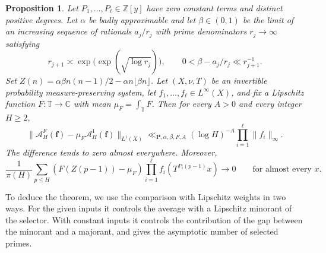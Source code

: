 \documentclass[12pt]{amsart}
\newcommand{\1}{\mathbf 1}
\newtheorem{proposition}[theorem]{Proposition}
\theoremstyle{definition}
\begin{document}
\begin{proposition}\label{p:ergodic-comparison}
Let $P_1,\ldots,P_\ell\in\mathbb Z[y]$ have zero constant terms
and distinct positive degrees. Let $\alpha$ be badly approximable
and let $\beta\in(0,1)$ be the limit of an increasing sequence
of rationals $a_j/r_j$ with prime denominators $r_j\to\infty$
satisfying
\[
 r_{j+1}\asymp\exp\!\bigl(\exp(\sqrt{\log r_j})\bigr),
 \qquad 0<\beta-a_j/r_j\ll r_{j+1}^{-1}.
\]
Set $Z(n)=\alpha\beta n(n-1)/2-\alpha n\lfloor\beta n\rfloor$.
Let $(X,\nu,T)$ be an invertible probability measure-preserving
system, let $f_1,\ldots,f_\ell\in L^\infty(X)$, and fix a Lipschitz
function $F:\mathbb T\to\mathbb C$ with mean
$\mu_F=\int_{\mathbb T}F$. Then for every $A>0$ and every integer
$H\geq2$,
\begin{equation}\label{e:ergodic-L1-log}
 \|\mathcal A_H^F(\mathbf f)-\mu_F\mathcal A_H^1(\mathbf f)\|_{L^1(X)}
 \ll_{\mathbf P,\alpha,\beta,F,A}
       (\log H)^{-A}\prod_{i=1}^{\ell}\|f_i\|_\infty.
\end{equation}
The difference tends to zero almost everywhere. Moreover,
\begin{equation}\label{e:smooth-prime-comparison}
 \frac1{\pi(H)}\sum_{p\le H}
 (F(Z(p-1))-\mu_F)\prod_{i=1}^{\ell} f_i(T^{P_i(p-1)}x)
 \longrightarrow 0
 \qquad\text{for almost every }x.
\end{equation}
\end{proposition}

To deduce the theorem, we use the comparison with Lipschitz
weights in two ways. For the given inputs it controls the average
with a Lipschitz minorant of the selector. With constant inputs
it controls the contribution of the gap between the minorant and
a majorant, and gives the asymptotic number of selected primes.
\end{document}
